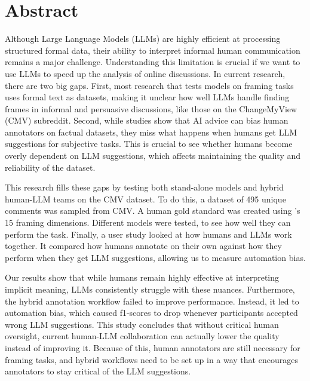 \documentclass[
10pt, %
a4paper, %
oneside, %
headinclude,footinclude, %
] {book}%
\begin{document}
\chapter*{Abstract}
Although Large Language Models (LLMs) are highly efficient at processing structured formal data, their ability to interpret informal human communication remains a major challenge. Understanding this limitation is crucial if we want to use LLMs to speed up the analysis of online discussions. In current research, there are two big gaps. First, most research that tests models on framing tasks uses formal text as datasets, making it unclear how well LLMs handle finding frames in informal and persuasive discussions, like those on the ChangeMyView (CMV) subreddit. Second, while studies show that AI advice can bias human annotators on factual datasets, they miss what happens when humans get LLM suggestions for subjective tasks. This is crucial to see whether humans become overly dependent on LLM suggestions, which affects maintaining the quality and reliability of the dataset.

This research fills these gaps by testing both stand-alone models and hybrid human-LLM teams on the CMV dataset. To do this, a dataset of 495 unique comments was sampled from CMV. A human gold standard was created using \citeauthor{card2015media}'s \citeyearpar{card2015media} 15 framing dimensions. Different models were tested, to see how well they can perform the task. Finally, a user study looked at how humans and LLMs work together. It compared how humans annotate on their own against how they perform when they get LLM suggestions, allowing us to measure automation bias.

Our results show that while humans remain highly effective at interpreting implicit meaning, LLMs consistently struggle with these nuances. Furthermore, the hybrid annotation workflow failed to improve performance. Instead, it led to automation bias, which caused f1-scores to drop whenever participants accepted wrong LLM suggestions. This study concludes that without critical human oversight, current human-LLM collaboration can actually lower the quality instead of improving it. Because of this, human annotators are still necessary for framing tasks, and hybrid workflows need to be set up in a way that encourages annotators to stay critical of the LLM suggestions.




\clearpage
\setcounter{tocdepth}{3} %
\tableofcontents %
\end{document}
